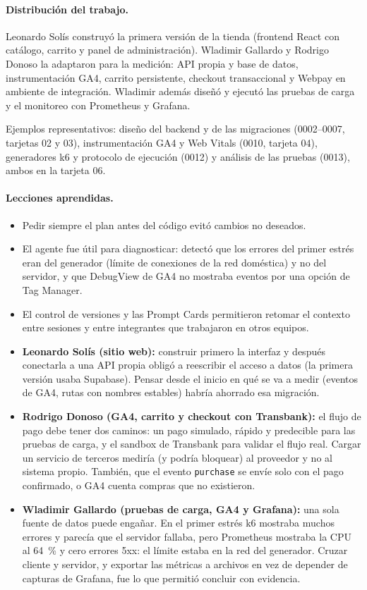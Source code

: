 \documentclass[11pt,a4paper]{article}
\newcommand{\codigo}[1]{\texttt{#1}}
\begin{document}
\paragraph{Distribución del trabajo.} Leonardo Solís construyó la primera
versión de la tienda (frontend React con catálogo, carrito y panel de
administración). Wladimir Gallardo y Rodrigo Donoso la adaptaron para la
medición: API propia y base de datos, instrumentación GA4, carrito persistente,
checkout transaccional y Webpay en ambiente de integración. Wladimir además
diseñó y ejecutó las pruebas de carga y el monitoreo con Prometheus y Grafana.

Ejemplos representativos: diseño del backend y de las migraciones (0002--0007,
tarjetas 02 y 03), instrumentación GA4 y Web Vitals (0010, tarjeta 04),
generadores k6 y protocolo de ejecución (0012) y análisis de las pruebas (0013),
ambos en la tarjeta 06.

\paragraph{Lecciones aprendidas.}
\begin{itemize}
  \item Pedir siempre el plan antes del código evitó cambios no deseados.
  \item El agente fue útil para diagnosticar: detectó que los errores del
        primer estrés eran del generador (límite de conexiones de la red
        doméstica) y no del servidor, y que DebugView de GA4 no mostraba eventos
        por una opción de Tag Manager.
  \item El control de versiones y las Prompt Cards permitieron retomar el contexto
        entre sesiones y entre integrantes que trabajaron en otros equipos.
  \item \textbf{Leonardo Solís (sitio web):} construir primero la interfaz y
        después conectarla a una API propia obligó a reescribir el acceso a
        datos (la primera versión usaba Supabase). Pensar desde el inicio en
        qué se va a medir (eventos de GA4, rutas con nombres estables) habría
        ahorrado esa migración.
  \item \textbf{Rodrigo Donoso (GA4, carrito y checkout con Transbank):} el
        flujo de pago debe tener dos caminos: un pago simulado, rápido y
        predecible para las pruebas de carga, y el sandbox de Transbank para
        validar el flujo real. Cargar un servicio de terceros mediría (y
        podría bloquear) al proveedor y no al sistema propio. También, que el
        evento \codigo{purchase} se envíe solo con el pago confirmado, o GA4
        cuenta compras que no existieron.
  \item \textbf{Wladimir Gallardo (pruebas de carga, GA4 y Grafana):} una sola
        fuente de datos puede engañar. En el primer estrés k6 mostraba muchos
        errores y parecía que el servidor fallaba, pero Prometheus mostraba la
        CPU al 64~\% y cero errores 5xx: el límite estaba en la red del
        generador. Cruzar cliente y servidor, y exportar las métricas a
        archivos en vez de depender de capturas de Grafana, fue lo que permitió
        concluir con evidencia.
\end{itemize}
\end{document}
